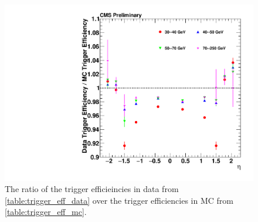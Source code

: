 \begin{figure}[!p]
    \centering
    \includegraphics[width=\textwidth]{figures/trigger_eff_ratio.pdf}
    \caption[
        The ratio of the trigger efficieincies.
    ]{
        The ratio of the trigger efficieincies in data from
        \cref{table:trigger_eff_data} over the trigger efficiencies in
        \MADGRAPH MC from \cref{table:trigger_eff_mc}.
    }
    \label{fig:trigger_eff_ratio}
\end{figure}
